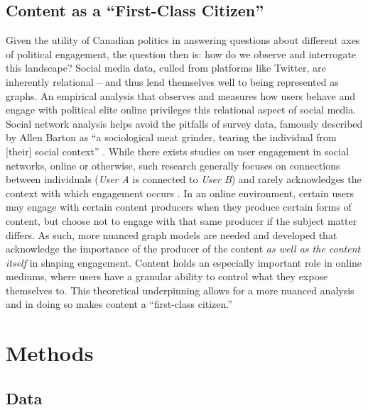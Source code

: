 \subsection{Content as a ``First-Class Citizen''}

Given the utility of Canadian politics in answering questions about different
axes of political engagement, the question then is: how do we observe and
interrogate this landscape? Social media data, culled from platforms like
Twitter, are inherently relational -- and thus lend themselves well to being
represented as graphs. An empirical analysis that observes and measures how
users behave and engage with political elite online privileges this relational
aspect of social media. Social network analysis helps avoid the pitfalls of
survey data, famously described by Allen Barton as “a sociological meat grinder,
tearing the individual from [their] social context”
\cite{freeman2004development}. While there exists studies on user engagement in
social networks, online or otherwise, such research generally focuses on
connections between individuals (\emph{User A} is connected to \emph{User B})
and rarely acknowledges the context with which engagement occurs
\cite{Zhang2017FindingCU,kavanaugh2002community,hofer2013perceived,miller2015talking}.
In an online environment, certain users may engage with certain content
producers when they produce certain forms of content, but choose not to engage
with that same producer if the subject matter differs. As such, more nuanced
graph models are needed and developed that acknowledge the importance of the
producer of the content \emph{as well as the content itself} in shaping
engagement. Content holds an especially important role in online mediums, where
users have a granular ability to control what they expose themselves to. This
theoretical underpinning allows for a more nuanced analysis and in doing so
makes content a ``first-class citizen.''


\section{Methods}

\subsection{Data}

